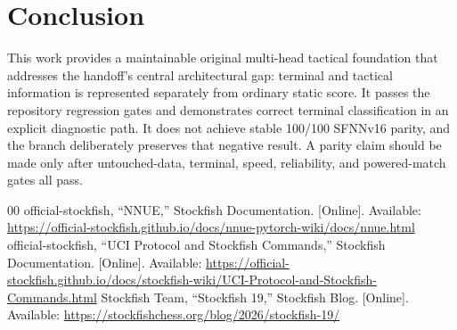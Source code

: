 \documentclass[conference]{IEEEtran}
\begin{document}
\section{Conclusion}
This work provides a maintainable original multi-head tactical foundation that addresses the handoff's central architectural gap: terminal and tactical information is represented separately from ordinary static score. It passes the repository regression gates and demonstrates correct terminal classification in an explicit diagnostic path. It does not achieve stable 100/100 SFNNv16 parity, and the branch deliberately preserves that negative result. A parity claim should be made only after untouched-data, terminal, speed, reliability, and powered-match gates all pass.

\begin{thebibliography}{00}
 official-stockfish, ``NNUE,'' Stockfish Documentation. [Online]. Available: \url{https://official-stockfish.github.io/docs/nnue-pytorch-wiki/docs/nnue.html}
 official-stockfish, ``UCI Protocol and Stockfish Commands,'' Stockfish Documentation. [Online]. Available: \url{https://official-stockfish.github.io/docs/stockfish-wiki/UCI-Protocol-and-Stockfish-Commands.html}
 Stockfish Team, ``Stockfish 19,'' Stockfish Blog. [Online]. Available: \url{https://stockfishchess.org/blog/2026/stockfish-19/}
\end{thebibliography}
\end{document}
